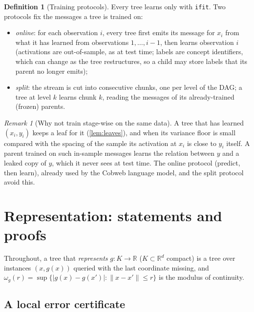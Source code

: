 \documentclass[11pt]{article}
\theoremstyle{definition}
\newtheorem{definition}[theorem]{Definition}
\theoremstyle{remark}
\newtheorem{remark}[theorem]{Remark}
\newcommand{\R}{\mathbb{R}}
\begin{document}
\begin{definition}[Training protocols]\label{def:forestlearn}
Every tree learns only with \texttt{ifit}.  Two protocols fix the messages a tree is
trained on:
\begin{itemize}[leftmargin=*]
\item \emph{online}: for each observation $i$, every tree first emits its message for
  $x_i$ from what it has learned from observations $1,\dots,i-1$, then learns
    observation $i$ (activations are out-of-sample, as at test time; labels are concept
  identifiers, which can change as the tree restructures, so a child may store labels
  that its parent no longer emits);
\item \emph{split}: the stream is cut into consecutive chunks, one per level of the DAG;
  a tree at level $k$ learns chunk $k$, reading the messages of its already-trained
  (frozen) parents.
\end{itemize}
\end{definition}

\begin{remark}[Why not train stage-wise on the same data]
A tree that has learned $(x_i,y_i)$ keeps a leaf for it (\cref{lem:leaves}), and when
its variance floor is small compared with the spacing of the sample its activation at
$x_i$ is close to $y_i$ itself.  A parent trained on such in-sample
messages learns the relation between $y$ and a leaked copy of $y$, which it never sees at
test time.  The online protocol (predict, then learn), already used by the Cobweb
language model, and the split protocol avoid this.
\end{remark}

\section{Representation: statements and proofs}\label{sec:repr}

Throughout, a tree that \emph{represents} $g:K\to\R$ ($K\subset\R^d$ compact) is a tree
over instances $(x,g(x))$ queried with the last coordinate missing, and
$\omega_g(r)=\sup\{|g(x)-g(x')|:\|x-x'\|\le r\}$ is the modulus of continuity.

\subsection{A local error certificate}
\end{document}
